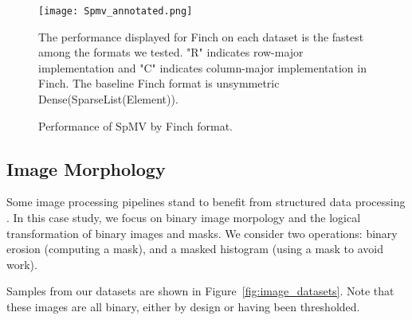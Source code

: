 



\begin{figure}
    \texttt{[image: Spmv\_annotated.png]}
    \vspace{-18pt}
    \caption{Performance of SpMV by Finch format.}
    \label{fig:spmv_grouped}
    \footnotesize The performance displayed for Finch on each dataset is the fastest among the formats we tested. "R" indicates row-major implementation and "C" indicates column-major implementation in Finch. The baseline Finch format is unsymmetric Dense(SparseList(Element)).
\end{figure}

\subsection{Image Morphology}

Some image processing pipelines stand to benefit from structured data processing \cite{donenfeld_unified_2022}.
In this case study, we focus on binary image morpology and the logical transformation of binary images and masks.
We consider two operations: binary erosion (computing a mask), and a masked histogram (using a mask to avoid work).

Samples from our datasets are shown in Figure~\ref{fig:image_datasets}. Note that these images are all binary, either by design or having been thresholded.

